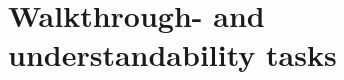 \section{Walkthrough- and understandability tasks}\label{appendix:usability_tasks}
\begin{figure}
    \centering 
    
\end{figure}